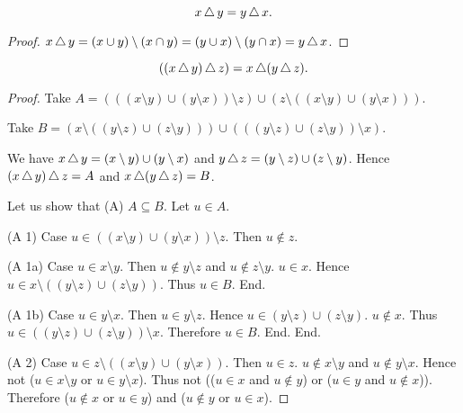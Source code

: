 \documentclass[../../set-theory.ftl.tex]{subfiles}
\begin{document}
  \begin{forthel}
    \begin{proposition}\label{SetTheory_01_04_688675}
      \[ x \mathop{\triangle} y = y \mathop{\triangle} x. \]
    \end{proposition}
    \begin{proof}
      $x \mathop{\triangle} y
      = (x \cup y) \setminus (x \cap y)
      = (y \cup x) \setminus (y \cap x)
      = y \mathop{\triangle} x$.
    \end{proof}


    \begin{proposition}\label{SetTheory_01_04_606646}
      \[ ((x \mathop{\triangle} y) \mathop{\triangle} z) = x \mathop{\triangle} (y \mathop{\triangle} z). \]
    \end{proposition}
    \begin{proof}
      Take $A = (((x \setminus y) \cup (y \setminus x)) \setminus z) \cup (z \setminus ((x \setminus y) \cup (y \setminus x)))$.

      Take $B = (x \setminus ((y \setminus z) \cup (z \setminus y))) \cup (((y \setminus z) \cup (z \setminus y)) \setminus x)$.

      We have $x \mathop{\triangle} y = (x \setminus y) \cup (y \setminus x)$ and $y \mathop{\triangle} z = (y \setminus z) \cup (z \setminus y)$.
      Hence $(x \mathop{\triangle} y) \mathop{\triangle} z = A$ and $x \mathop{\triangle} (y \mathop{\triangle} z) = B$.

      Let us show that (A) $A \subseteq B$.
        Let $u \in A$.

        (A 1) Case $u \in ((x \setminus y) \cup (y \setminus x)) \setminus z$.
          Then $u \notin z$.

          (A 1a) Case $u \in x \setminus y$.
            Then $u \notin y \setminus z$ and $u \notin z \setminus y$.
            $u \in x$.
            Hence $u \in x \setminus ((y \setminus z) \cup (z \setminus y))$.
            Thus $u \in B$.
          End.

          (A 1b) Case $u \in y \setminus x$.
            Then $u \in y \setminus z$.
            Hence $u \in (y \setminus z) \cup (z \setminus y)$.
            $u \notin x$.
            Thus $u \in ((y \setminus z) \cup (z \setminus y)) \setminus x$.
            Therefore $u \in B$.
          End.
        End.

        (A 2) Case $u \in z \setminus ((x \setminus y) \cup (y \setminus x))$.
          Then $u \in z$.
          $u \notin x \setminus y$ and $u \notin y \setminus x$.
          Hence not ($u \in x \setminus y$ or $u \in y \setminus x$).
          Thus not (($u \in x$ and $u \notin y$) or ($u \in y$ and
          $u \notin x$)).
          Therefore ($u \notin x$ or $u \in y$) and ($u \notin y$ or $u \in x$).


\end{proof}
\end{forthel}
\end{document}
